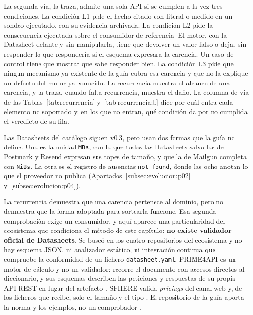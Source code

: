 La segunda vía, la traza, admite una sola API si se cumplen a la vez tres condiciones.
La condición L1 pide el hecho citado con literal o medido en un sondeo ejecutado, con su evidencia archivada.
La condición L2 pide la consecuencia ejecutada sobre el consumidor de referencia.
El motor, con la Datasheet delante y sin manipularla, tiene que devolver un valor falso o dejar sin responder lo que respondería si el esquema expresara la carencia.
Un caso de control tiene que mostrar que sabe responder bien.
La condición L3 pide que ningún mecanismo ya existente de la guía cubra esa carencia y que no la explique un defecto del motor ya conocido.
La recurrencia muestra el alcance de una carencia, y la traza, cuando falta recurrencia, muestra el daño.
La columna de vía de las Tablas~\ref{tab:recurrencia} y~\ref{tab:recurrencia:b} dice por cuál entra cada elemento no soportado y, en los que no entran, qué condición da por no cumplida el veredicto de su fila.

Las Datasheets del catálogo siguen v0.3, pero usan dos formas que la guía no define.
Una es la unidad \texttt{MBs}, con la que todas las Datasheets salvo las de Postmark y Resend expresan sus topes de tamaño, y que la de Mailgun completa con \texttt{MiBs}.
La otra es el registro de ausencias \texttt{not\_found}, donde las ocho anotan lo que el proveedor no publica (Apartados~\ref{subsec:evolucion:p02} y~\ref{subsec:evolucion:p04}).

La recurrencia demuestra que una carencia pertenece al dominio, pero no demuestra
que la forma adoptada para sortearla funcione. Esa segunda comprobación exige un
consumidor, y aquí aparece una particularidad del ecosistema que condiciona el
método de este capítulo: \textbf{no existe validador oficial de Datasheets}. Se
buscó en los cuatro repositorios del ecosistema y no hay esquema JSON, ni
analizador estático, ni integración continua que compruebe la conformidad de un
fichero \texttt{datasheet.yaml}. PRIME4API es un motor de cálculo y no un
validador: recorre el documento con accesos directos al diccionario, y sus
esquemas describen las peticiones y respuestas de su propia API REST en lugar del
artefacto \citep{prime4apirepo}. SPHERE valida \textit{pricings} del canal web y,
de los ficheros que recibe, solo el tamaño y el tipo \citep{sphere}. El
repositorio de la guía aporta la norma y los ejemplos, no un comprobador
\citep{apisconsumptionmodel}.

